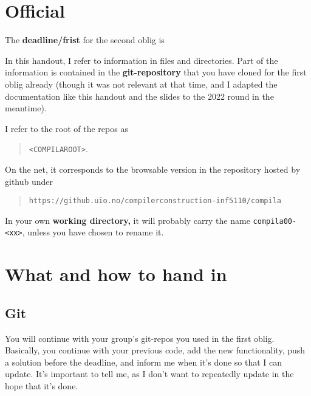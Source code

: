 \documentclass[11pt,freeform]{handout}[2014/08/13]
\begin{document}
\thispagestyle{empty}



\section{Official }
\label{sec:official-info}




\hrulefill{}

The \textbf{deadline/frist}  for the second oblig is

\begin{quote}
  \textbf{\deadlinetwo}
\end{quote}






In this handout, I refer to information in files and directories. Part of
the information is contained in the \textbf{git-repository} that you have
cloned for the first oblig already (though it was not relevant at that
time, and I adapted the documentation like this handout and the slides to
the 2022 round in the meantime).

I refer to the root of the repos as 
\begin{quote}
  \texttt{<COMPILAROOT>}.   
\end{quote}
On the net, it corresponds to the browsable version in the repository
hosted by github under

\begin{quote}
  \texttt{https://github.uio.no/compilerconstruction-inf5110/compila}
\end{quote}

In your own \textbf{working directory,} it will probably carry the name
\texttt{compila00-<xx>}, unless you have chosen to rename it.




\section{What and how to hand in}
\label{sec:what-how}


\subsection{Git}
\label{sec:git}

You will continue with your group's git-repos you used in the first oblig.
Basically, you continue with your previous code, add the new functionality,
push a solution before the deadline, and inform me when it's done so that I
can update. It's important to tell me, as I don't want to repeatedly update
in the hope that it's done.
\end{document}
